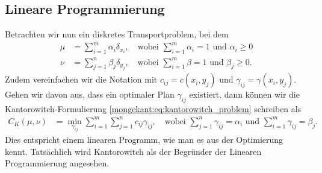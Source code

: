 \subsection{Lineare Programmierung%
\label{mongekant:subsection:linear_programming}}

Betrachten wir nun ein diskretes Transportproblem,
bei dem
\begin{align*}
\mu
&=
\sum_{i=1}^m \alpha_i \delta_{x_i}
,\quad\text{wobei }
\sum_{i=1}^m \alpha_i = 1
\text{ und }
\alpha_i \geq 0
\\
\nu
&=
\sum_{j=1}^n \beta_j \delta_{y_j}
,\quad\text{wobei }
\sum_{i=1}^m \beta = 1
\text{ und }
\beta_j \geq 0
.
\end{align*}
Zudem vereinfachen wir die Notation mit $c_{ij} = c(x_i, y_j)$ und
$\gamma_{ij} = \gamma(x_i, y_j)$.
Gehen wir davon aus,
dass ein optimaler Plan $\gamma_{ij}$ existiert,
dann können wir die Kantorowitch-Formulierung \eqref{mongekant:eq:kantorowitch_problem} schreiben als
\begin{align*}
C_K(\mu, \nu)
&=
\min_{\gamma_{ij}}
\sum_{i=1}^m \sum_{j=1}^n c_{ij} \gamma_{ij}
,\quad
\text{wobei }
\sum_{j=1}^n \gamma_{ij} = \alpha_i
\text{ und }
\sum_{i=1}^m \gamma_{ij} = \beta_j
.
\end{align*}
Dies entspricht einem linearen Programm,
wie man es aus der Optimierung kennt.
Tatsächlich wird Kantorowitch als der Begründer der Linearen Programmierung angesehen.
